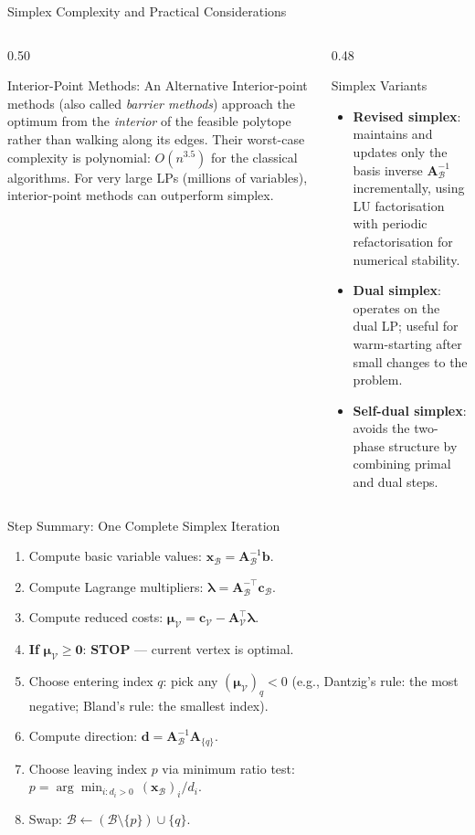 \documentclass[aspectratio=169,10pt]{beamer}
\newcommand{\xv}{\mathbf{x}}
\newcommand{\cv}{\mathbf{c}}
\newcommand{\bv}{\mathbf{b}}
\newcommand{\Av}{\mathbf{A}}
\newcommand{\muv}{\boldsymbol{\mu}}
\newcommand{\lav}{\boldsymbol{\lambda}}
\newcommand{\calB}{\mathcal{B}}
\newcommand{\calV}{\mathcal{V}}
\begin{document}
\begin{frame}[allowframebreaks]{Simplex Complexity and Practical Considerations}
\begin{columns}
  \begin{column}{0.50\textwidth}
    \begin{block}{Interior-Point Methods: An Alternative}
      Interior-point methods (also called \emph{barrier methods}) approach the
      optimum from the \emph{interior} of the feasible polytope rather than walking
      along its edges.  Their worst-case complexity is polynomial: $O(n^{3.5})$
      for the classical algorithms.  For very large LPs (millions of variables),
      interior-point methods can outperform simplex.
    \end{block}
  \end{column}
  \begin{column}{0.48\textwidth}
    \begin{block}{Simplex Variants}
      \begin{itemize}
        \item \textbf{Revised simplex}: maintains and updates only the basis
              inverse $\Av_\calB^{-1}$ incrementally, using LU factorisation
              with periodic refactorisation for numerical stability.
        \item \textbf{Dual simplex}: operates on the dual LP; useful for
              warm-starting after small changes to the problem.
        \item \textbf{Self-dual simplex}: avoids the two-phase structure by
              combining primal and dual steps.
      \end{itemize}
    \end{block}
  \end{column}
\end{columns}

\begin{block}{Step Summary: One Complete Simplex Iteration}
  \begin{enumerate}
    \item Compute basic variable values: $\xv_\calB = \Av_\calB^{-1}\bv$.
    \item Compute Lagrange multipliers: $\lav = \Av_\calB^{-\top}\cv_\calB$.
    \item Compute reduced costs: $\muv_\calV = \cv_\calV - \Av_\calV^\top\lav$.
    \item \textbf{If} $\muv_\calV \ge \mathbf{0}$: \textbf{STOP} --- current vertex is optimal.
    \item Choose entering index $q$: pick any $(\muv_\calV)_q < 0$
          (e.g., Dantzig's rule: the most negative; Bland's rule: the smallest index).
    \item Compute direction: $\mathbf{d} = \Av_\calB^{-1}\Av_{\{q\}}$.
    \item Choose leaving index $p$ via minimum ratio test:
          $p = \arg\min_{i: d_i > 0}\, (\xv_\calB)_i / d_i$.
    \item Swap: $\calB \leftarrow (\calB \setminus \{p\}) \cup \{q\}$.
  \end{enumerate}
\end{block}

\end{frame}
\end{document}
